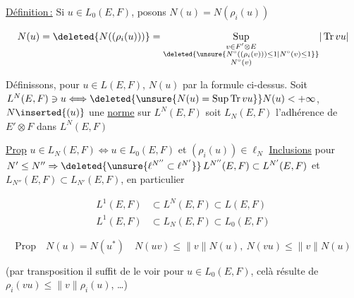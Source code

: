 \uline{Définition\,:} Si $u\in L_0(E,F)$, posons $N(u)=N(\rho_i(u))$

\[
N(u)=\deleted{N((\rho_i(u)))}=\underset{\substack{v\in F'\otimes E\\\deleted{\unsure{N^\circ((\rho_i(v)))\leq 1|N^\circ(v)\leq1}}\\N^\circ(v)}}{\operatorname{Sup}}|\operatorname{Tr}vu|
\]

Définissons, pour $u\in L(E,F)$, $N(u)$ par la formule ci-dessus. Soit $L^N(E,F)\ni u\Longleftrightarrow\deleted{\unsure{N(u)=\operatorname{Sup}\operatorname{Tr}vu}}N(u)<+\infty$, $N\inserted{(u)}$  une \uline{norme} sur $L^N(E,F)$  soit $L_N(E,F)$ l'adhérence de $E'\otimes F$ dans $L^N(E,F)$

 \uline{Prop} $u\in L_N(E,F)\Longleftrightarrow u\in L_0(E,F)$ et $(\rho_i(u))\in\ell_N$   \uline{Inclusions} pour $N'\leq N''\Rightarrow\deleted{\unsure{\ell^{N''}\subset\ell^{N'}}}\,L^{N''}(E,F)\subset L^{N'}(E,F)$ et $L_{N''}(E,F)\subset L_{N'}(E,F)$, en particulier

\[
\begin{aligned}
L^1(E,F)&\subset L^N(E,F)\subset L(E,F)\\
L^1(E,F)&\subset L_N(E,F)\subset L_0(E,F)
\end{aligned}
\]


\[
\text{Prop}\quad\boxed{N(u)=N(u^*)\quad N(uv)\leq\lVert v\rVert N(u),\ N(vu)\leq\lVert v\rVert N(u)}
\]

 (par transposition il suffit de le voir pour $u\in L_0(E,F)$, celà résulte de $\rho_i(vu)\leq\lVert v\rVert\rho_i(u)$, \ldots)

